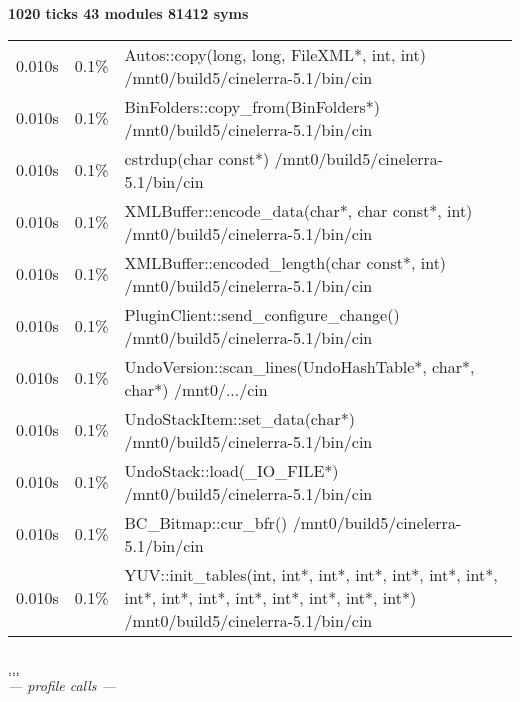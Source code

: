 \textbf{1020 ticks 43 modules 81412 syms}\\
\begin{tabular}{@{}rrp{\linewidth-6em}}
 0.010s & 0.1\% & Autos::copy(long, long, FileXML*, int, int) /mnt0/build5/cinelerra-5.1/bin/cin\\
 0.010s & 0.1\% & BinFolders::copy\_from(BinFolders*) /mnt0/build5/cinelerra-5.1/bin/cin\\
 0.010s & 0.1\% & cstrdup(char const*)     /mnt0/build5/cinelerra-5.1/bin/cin\\
 0.010s & 0.1\% & XMLBuffer::encode\_data(char*, char const*, int) /mnt0/build5/cinelerra-5.1/bin/cin\\
 0.010s & 0.1\% & XMLBuffer::encoded\_length(char const*, int) /mnt0/build5/cinelerra-5.1/bin/cin\\
 0.010s & 0.1\% & PluginClient::send\_configure\_change() /mnt0/build5/cinelerra-5.1/bin/cin\\
 0.010s & 0.1\% & UndoVersion::scan\_lines(UndoHashTable*, char*, char*) /mnt0/.../cin\\
 0.010s & 0.1\% & UndoStackItem::set\_data(char*) /mnt0/build5/cinelerra-5.1/bin/cin\\
 0.010s & 0.1\% & UndoStack::load(\_IO\_FILE*) /mnt0/build5/cinelerra-5.1/bin/cin\\
 0.010s & 0.1\% & BC\_Bitmap::cur\_bfr()     /mnt0/build5/cinelerra-5.1/bin/cin\\
 0.010s & 0.1\% & YUV::init\_tables(int, int*, int*, int*, int*, int*, int*, int*, int*, int*, int*, int*, int*, int*, int*) /mnt0/build5/cinelerra-5.1/bin/cin\\
\end{tabular}\\
$\dots$\\
$\dots$\\
\textit{--- profile calls ---}

